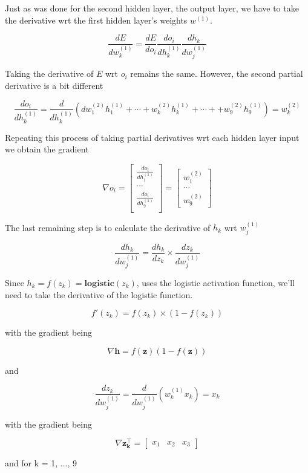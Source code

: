\documentclass[11pt]{article}%
\begin{document}
	Just as was done for the second hidden layer, the output layer, we have to take the derivative wrt the first hidden layer's weights $w^{(1)}$.
	
	$$
	\frac{dE}{dw^{(1)}_k} = \frac{dE}{do_i} \frac{do_i}{dh^{(1)}_k} \frac{dh_k}{dw^{(1)}_j}
	$$


	Taking the derivative of $E$ wrt $o_i$ remains the same. However, the second partial derivative is a bit different

	$$
	\frac{do_i}{dh^{(1)}_k} = \frac{d}{dh^{(1)}_k}  (dw^{(2)}_1 h^{(1)}_1+ \cdots + w^{(2)}_k h^{(1)}_k + \cdots + + w^{(2)}_9 h^{(1)}_9)
	= w^{(2)}_k
	$$

	Repeating this process of taking partial derivatives wrt each hidden layer input we obtain the gradient
	
	$$
	\nabla o_i = \begin{bmatrix}
	\frac{do_i}{dh^{(1)}_1} \\ 
	\cdots \\ 
	\frac{do_i}{dh^{(1)}_9} \\ 
	\end{bmatrix}
	= \begin{bmatrix}
	w^{(2)}_1 \\
	\cdots \\
	w^{(2)}_9
	\end{bmatrix}
	$$


	The last remaining step is to calculate the derivative of $h_k$ wrt $w^{(1)}_j$
	
	$$
	\frac{dh_k}{dw^{(1)}_j} = \frac{dh_k}{dz_k} \times \frac{dz_k}{dw^{(1)}_j}
	$$
	
	Since $h_k = f(z_k) = \textbf{logistic}(z_k)$, uses the logistic activation function, we'll need to take the derivative of the logistic function. 
	
	$$
	f'(z_k) = f(z_k) \times (1 - f(z_k))
	$$
	
with the gradient being

	$$
	\nabla \mathbf{h} = f(\mathbf{z}) (1 - f(\mathbf{z}))
	$$

and 

	$$
	\frac{dz_k}{dw^{(1)}_j} = \frac{d}{dw^{(1)}_j} (w^{(1)}_k x_k) = x_k
	$$

with the gradient being

	$$
	\nabla \mathbf{z^\intercal_k} =  \begin{bmatrix}
	x_1 & x_2 & x_3
	\end{bmatrix}
	$$

and for k = 1, ..., 9
\end{document}
